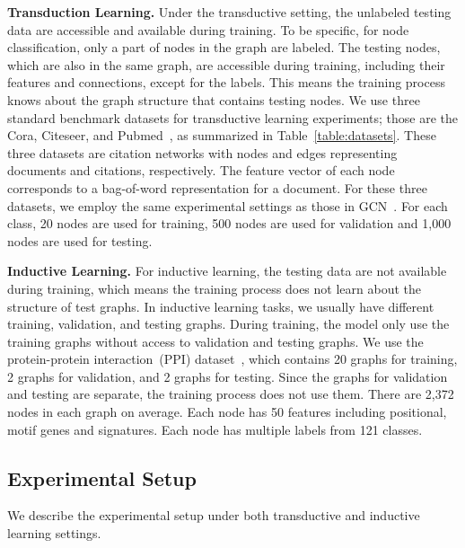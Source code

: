 \documentclass[sigconf]{acmart}
\begin{document}
\textbf{Transduction Learning.} Under the transductive setting, the
unlabeled testing data are accessible and available during training.
To be specific, for node classification, only a part of nodes in the
graph are labeled. The testing nodes, which are also in the same
graph, are accessible during training, including their features and
connections, except for the labels. This means the training process
knows about the graph structure that contains testing nodes. We use
three standard benchmark datasets for transductive learning
experiments; those are the Cora, Citeseer, and
Pubmed~\cite{sen2008collective}, as summarized in
Table~\ref{table:datasets}. These three datasets are citation
networks with nodes and edges representing documents and citations,
respectively. The feature vector of each node corresponds to a
bag-of-word representation for a document. For these three datasets,
we employ the same experimental settings as those in
GCN~\cite{kipf2016semi}. For each class, 20 nodes are used for
training, 500 nodes are used for validation and 1,000 nodes are used
for testing.


\textbf{Inductive Learning.} For inductive learning, the testing
data are not available during training, which means the training
process does not learn about the structure of test graphs. In
inductive learning tasks, we usually have different training,
validation, and testing graphs. During training, the model only use
the training graphs without access to validation and testing graphs.
We use the protein-protein interaction~(PPI)
dataset~\cite{zitnik2017predicting}, which contains 20 graphs for
training, 2 graphs for validation, and 2 graphs for testing. Since
the graphs for validation and testing are separate, the training
process does not use them. There are 2,372 nodes in each graph on
average. Each node has 50 features including positional, motif genes
and signatures. Each node has multiple labels from 121 classes.


\subsection{Experimental Setup}\label{sec:expsetup}

We describe the experimental setup under both transductive and
inductive learning settings.
\end{document}
